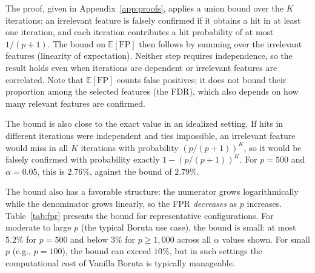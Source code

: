 \documentclass[runningheads]{llncs}
\begin{document}
The proof, given in Appendix~\ref{app:proofs}, applies a union bound over the $K$ iterations: an irrelevant feature is falsely confirmed if it obtains a hit in at least one iteration, and each iteration contributes a hit probability of at most $1/(p+1)$. The bound on $\mathbb{E}[\mathrm{FP}]$ then follows by summing over the irrelevant features (linearity of expectation). Neither step requires independence, so the result holds even when iterations are dependent or irrelevant features are correlated. Note that $\mathbb{E}[\mathrm{FP}]$ counts false positives; it does not bound their proportion among the selected features (the FDR), which also depends on how many relevant features are confirmed.

The bound is also close to the exact value in an idealized setting. If hits in different iterations were independent and ties impossible, an irrelevant feature would miss in all $K$ iterations with probability $(p/(p+1))^K$, so it would be falsely confirmed with probability exactly $1-(p/(p+1))^K$. For $p=500$ and $\alpha=0.05$, this is $2.76\%$, against the bound of $2.79\%$.

The bound also has a favorable structure: the numerator grows logarithmically while the denominator grows linearly, so the FPR \emph{decreases} as $p$ increases. Table~\ref{tab:fpr} presents the bound for representative configurations. For moderate to large $p$ (the typical Boruta use case), the bound is small: at most $5.2\%$ for $p = 500$ and below $3\%$ for $p \geq 1{,}000$ across all $\alpha$ values shown. For small $p$ (e.g., $p = 100$), the bound can exceed $10\%$, but in such settings the computational cost of Vanilla Boruta is typically manageable.
\end{document}
